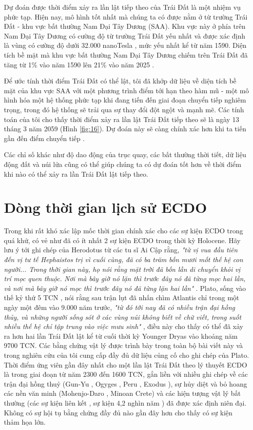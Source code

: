 \documentclass[10pt,twocolumn,letterpaper]{article}
\begin{document}
Dự đoán được thời điểm xảy ra lần lật tiếp theo của Trái Đất là một nhiệm vụ phức tạp. Hiện nay, mô hình tốt nhất mà chúng ta có được nằm ở từ trường Trái Đất - khu vực bất thường Nam Đại Tây Dương (SAA). Khu vực này ở phía trên Nam Đại Tây Dương có cường độ từ trường Trái Đất yếu nhất và được xác định là vùng có cường độ dưới 32.000 nanoTesla \cite{135}, mức yếu nhất kể từ năm 1590. Diện tích bề mặt mà khu vực bất thường Nam Đại Tây Dương chiếm trên Trái Đất đã tăng từ 1\% vào năm 1590 lên 21\% vào năm 2025 \cite{136}.

Để ước tính thời điểm Trái Đất có thể lật, tôi đã khớp dữ liệu về diện tích bề mặt của khu vực SAA với một phương trình điểm tới hạn theo hàm mũ - một mô hình hóa một hệ thống phức tạp khi đang tiến đến giai đoạn chuyển tiếp nghiêm trọng, trong đó hệ thống sẽ trải qua sự thay đổi đột ngột và mạnh mẽ. Các tính toán của tôi cho thấy thời điểm xảy ra lần lật Trái Đất tiếp theo sẽ là ngày 13 tháng 3 năm 2059 (Hình \ref{fig:16}). Dự đoán này sẽ càng chính xác hơn khi ta tiến gần đến điểm chuyển tiếp \cite{136}.

Các chỉ số khác như độ dao động của trục quay, các bất thường thời tiết, dữ liệu động đất và núi lửa cũng có thể giúp chúng ta có dự đoán tốt hơn về thời điểm khi nào có thể xảy ra lần Trái Đất lật tiếp theo.

\section{Dòng thời gian lịch sử ECDO}

Trong khi rất khó xác lập mốc thời gian chính xác cho các sự kiện ECDO trong quá khứ, có vẻ như đã có ít nhất 2 sự kiện ECDO trong thời kỳ Holocene. Hãy lưu ý tới ghi chép của Herodotus từ các tu sĩ Ai Cập rằng, \textit{"từ vị vua đầu tiên đến vị tư tế Hephaistos trị vì cuối cùng, đã có ba trăm bốn mươi mốt thế hệ con người... Trong thời gian này, họ nói rằng mặt trời đã bốn lần di chuyển khỏi vị trí mọc quen thuộc. Nơi mà bây giờ nó lặn thì trước đây nó đã từng mọc hai lần, và nơi mà bây giờ nó mọc thì trước đây nó đã từng lặn hai lần"} \cite{32}. Plato, sống vào thế kỷ thứ 5 TCN \cite{111}, nói rằng sau trận lụt đã nhấn chìm Atlantis chỉ trong một ngày một đêm vào 9.000 năm trước, \textit{"từ đó tới nay đã có nhiều trận đại hồng thủy, và những người sống sót ở các vùng núi không biết về chữ viết, trong suốt nhiều thế hệ chỉ tập trung vào việc mưu sinh"} \cite{112}, điều này cho thấy có thể đã xảy ra hơn hai lần Trái Đất lật kể từ cuối thời kỳ Younger Dryas vào khoảng năm 9700 TCN. Các bằng chứng vật lý được trình bày trong toàn bộ bài viết này và trong nghiên cứu của tôi \cite{2} cung cấp đầy đủ dữ liệu củng cố cho ghi chép của Plato.
Thời điểm ứng viên gần đây nhất cho một lần lật Trái Đất theo lý thuyết ECDO là trong giai đoạn từ năm 2300 đến 1600 TCN, gắn liền với nhiều ghi chép về các trận đại hồng thuỷ (Gun-Yu \cite{113,114,115}, Ogyges \cite{116,117}, Peru \cite{118,119}, Exodus \cite{120}), sự hủy diệt và bỏ hoang các nền văn minh (Mohenjo-Daro \cite{121}, Minoan Crete\cite{100,101}) và các hiện tượng vật lý bất thường (các sự kiện liên kết \cite{122}, sự kiện 4,2 nghìn năm \cite{90}) đã được xác định niên đại. Không có sự hội tụ bằng chứng đầy đủ nào gần đây hơn cho thấy có sự kiện thảm họa lớn.
\end{document}
